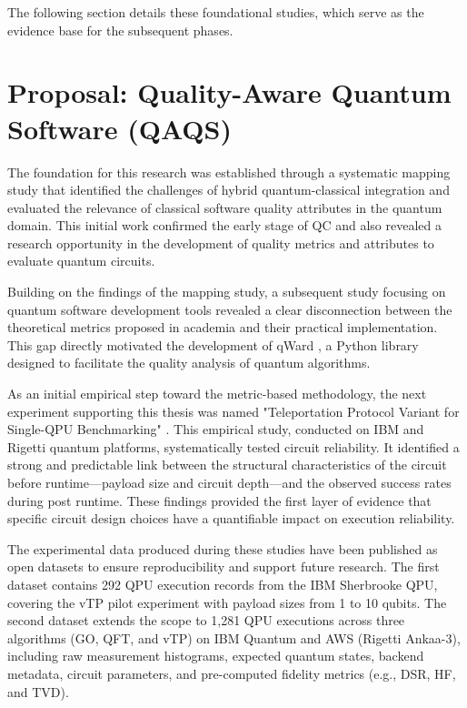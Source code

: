 \documentclass{article}
\begin{document}
The following section details these foundational studies, which serve as the evidence base for the subsequent phases.

\section{Proposal: Quality-Aware Quantum Software (QAQS)}
\label{section:qaqs}

The foundation for this research was established through a systematic mapping study \cite{marquezQualityConcernsWhena_2025} that identified the challenges of hybrid quantum-classical integration and evaluated the relevance of classical software quality attributes in the quantum domain. This initial work confirmed the early stage of QC and also revealed a research opportunity in the development of quality metrics and attributes to evaluate quantum circuits.

Building on the findings of the mapping study, a subsequent study focusing on quantum software development tools revealed a clear disconnection between the theoretical metrics proposed in academia and their practical implementation. This gap directly motivated the development of qWard \cite{marquezQwardUnifiedToolkit_2025, QiskitqwardFrameworkAnalyzing}, a Python library designed to facilitate the quality analysis of quantum algorithms.

As an initial empirical step toward the metric-based methodology, the next experiment supporting this thesis was named "Teleportation Protocol Variant for Single-QPU Benchmarking" \cite{ieeevTp2025}. This empirical study, conducted on IBM and Rigetti quantum platforms, systematically tested circuit reliability. It identified a strong and predictable link between the structural characteristics of the circuit before runtime---payload size and circuit depth---and the observed success rates during post runtime. These findings provided the first layer of evidence that specific circuit design choices have a quantifiable impact on execution reliability.

The experimental data produced during these studies have been published as open datasets to ensure reproducibility and support future research. The first dataset \cite{data_1} contains 292 QPU execution records from the IBM Sherbrooke QPU, covering the vTP pilot experiment with payload sizes from 1 to 10 qubits. The second dataset \cite{data_2} extends the scope to 1,281 QPU executions across three algorithms (GO, QFT, and vTP) on IBM Quantum and AWS (Rigetti Ankaa-3), including raw measurement histograms, expected quantum states, backend metadata, circuit parameters, and pre-computed fidelity metrics (e.g., DSR, HF, and TVD).
\end{document}
